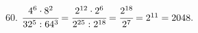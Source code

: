 60. $\cfrac{4^6\cdot 8^2}{32^5:64^3}=\cfrac{2^{12}\cdot 2^6}{2^{25}:2^{18}}=\cfrac{2^{18}}{2^7}=2^{11}=2048.$\\
